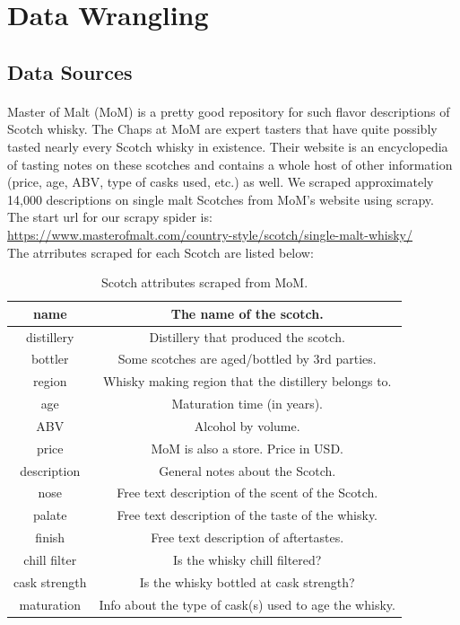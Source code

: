 \documentclass{article}
\begin{document}
	 \section{Data Wrangling}
	 \subsection{Data Sources}
	 \paragraph{}Master of Malt (MoM) is a pretty good repository for such flavor descriptions of Scotch whisky. The Chaps at MoM  are expert tasters that have quite possibly tasted nearly every Scotch whisky in existence. Their website is an encyclopedia of tasting notes on these scotches and contains a whole host of other information (price, age, ABV, type of casks used, etc.) as well. We scraped approximately 14,000 descriptions on single malt Scotches from MoM's website using scrapy. The start url for our scrapy spider is: \\ \href{https://www.masterofmalt.com/country-style/scotch/single-malt-whisky/}{https://www.masterofmalt.com/country-style/scotch/single-malt-whisky/} \\
	 
	 The atrributes scraped for each Scotch are listed below:
	 
	 \begin{table}[H]
	 	\begin{tabular}{|c|c|}
	 		\hline
	 		name &  The name of the scotch.\\
	 		\hline
	 		distillery &  Distillery that produced the scotch.\\
	 		\hline
	 		bottler &  Some scotches are aged/bottled by 3rd parties. \\
	 		\hline
	 		region & Whisky making region that the distillery belongs to. \\
	 		\hline
	 		age & Maturation time (in years).  \\
	 		\hline
	 		ABV & Alcohol by volume. \\
	 		\hline
	 		price & MoM is also a store. Price in USD.  \\
	 		\hline
	 		description & General notes about the Scotch.  \\
	 		\hline
	 		nose & Free text description of the scent of the Scotch.  \\
	 		\hline
	 		palate & Free text description of the taste of the whisky. \\
	 		\hline
	 		finish & Free text description of aftertastes.  \\
	 		\hline
	 		chill filter & Is the whisky chill filtered? \\
	 		\hline
	 		cask strength & Is the whisky bottled at cask strength? \\
	 		\hline
	 		maturation & Info about the type of cask(s) used to age the whisky. \\
	 		
	 		\hline
	 	\end{tabular}
	 	\caption{Scotch attributes scraped from MoM.}
	 \end{table}
  
\end{document}
